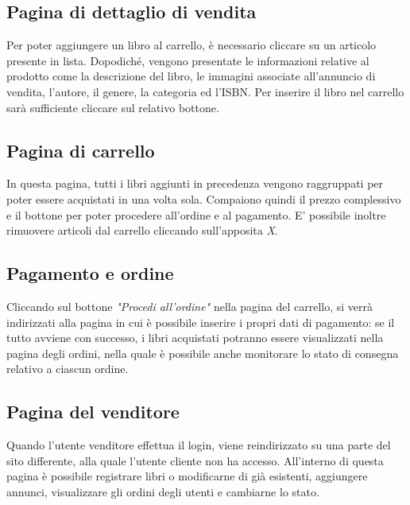\documentclass[a4paper]{report}
\begin{document}
	\subsection{Pagina di dettaglio di vendita} \label{ss:dettvend}
	Per poter aggiungere un libro al carrello, è necessario cliccare su un articolo presente in lista. Dopodiché, vengono presentate le informazioni relative al prodotto come la descrizione del libro, le immagini associate all'annuncio di vendita, l'autore, il genere, la categoria ed l'ISBN. Per inserire il libro nel carrello sarà sufficiente cliccare sul relativo bottone.
	\subsection{Pagina di carrello}
	In questa pagina, tutti i libri aggiunti in precedenza vengono raggruppati per poter essere acquistati in una volta sola. Compaiono quindi il prezzo complessivo e il bottone per poter procedere all'ordine e al pagamento. E' possibile inoltre rimuovere articoli dal carrello cliccando sull'apposita \textit{X}.
	\subsection{Pagamento e ordine}
	Cliccando sul bottone \textit{"Procedi all'ordine"} nella pagina del carrello, si verrà indirizzati alla pagina in cui è possibile inserire i propri dati di pagamento: se il tutto avviene con successo, i libri acquistati potranno essere visualizzati nella pagina degli ordini, nella quale è possibile anche monitorare lo stato di consegna relativo a ciascun ordine.
	\subsection{Pagina del venditore}
	Quando l'utente venditore effettua il login, viene reindirizzato su una parte del sito differente, alla quale l'utente cliente non ha accesso. All'interno di questa pagina è possibile registrare libri o modificarne di già esistenti, aggiungere annunci, visualizzare gli ordini degli utenti e cambiarne lo stato.
\end{document}
